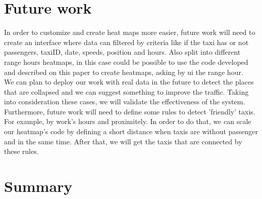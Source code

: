 \documentclass[11pt,conference,a4paper,twocolumns,romanappendices]{IEEEtran}
\begin{document}
\section{Future work}

In order to customize and create heat maps more easier, future work will need to create an interface where data can filtered by criteria like if the taxi has or not passengers, taxiID, date, speeds, position and hours. Also split into different range hours heatmaps, in this case could be possible to use the code developed and described on this paper to create heatmaps, asking by ui the range hour. \\
We can plan to deploy our work with real data in the future to detect the places that are collapsed and we can suggest something to improve the traffic. Taking into consideration these cases, we will validate the effectiveness of the system. \\
Furthermore, future work will need to define some rules to detect 'friendly' taxis. For example, by work's hours and proximitely. In order to do that, we can scale our heatmap's code by defining a short distance when taxis are without passenger and in the same time. After that, we will get the taxis that are connected by these rules.

\section{Summary}

\newpage


\end{document}
